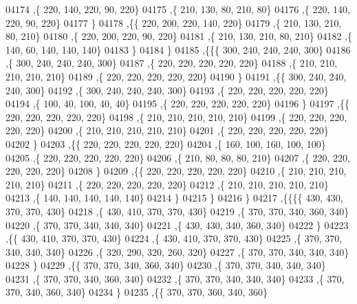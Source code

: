 \begin{DoxyCode}
04174     ,\{   220,   140,   220,    90,   220\}
04175     ,\{   210,   130,    80,   210,    80\}
04176     ,\{   220,   140,   220,    90,   220\}
04177     \}
04178    ,\{\{   220,   200,   220,   140,   220\}
04179     ,\{   210,   130,   210,    80,   210\}
04180     ,\{   220,   200,   220,    90,   220\}
04181     ,\{   210,   130,   210,    80,   210\}
04182     ,\{   140,    60,   140,   140,   140\}
04183     \}
04184    \}
04185   ,\{\{\{   300,   240,   240,   240,   300\}
04186     ,\{   300,   240,   240,   240,   300\}
04187     ,\{   220,   220,   220,   220,   220\}
04188     ,\{   210,   210,   210,   210,   210\}
04189     ,\{   220,   220,   220,   220,   220\}
04190     \}
04191    ,\{\{   300,   240,   240,   240,   300\}
04192     ,\{   300,   240,   240,   240,   300\}
04193     ,\{   220,   220,   220,   220,   220\}
04194     ,\{   100,    40,   100,    40,    40\}
04195     ,\{   220,   220,   220,   220,   220\}
04196     \}
04197    ,\{\{   220,   220,   220,   220,   220\}
04198     ,\{   210,   210,   210,   210,   210\}
04199     ,\{   220,   220,   220,   220,   220\}
04200     ,\{   210,   210,   210,   210,   210\}
04201     ,\{   220,   220,   220,   220,   220\}
04202     \}
04203    ,\{\{   220,   220,   220,   220,   220\}
04204     ,\{   160,   100,   160,   100,   100\}
04205     ,\{   220,   220,   220,   220,   220\}
04206     ,\{   210,    80,    80,    80,   210\}
04207     ,\{   220,   220,   220,   220,   220\}
04208     \}
04209    ,\{\{   220,   220,   220,   220,   220\}
04210     ,\{   210,   210,   210,   210,   210\}
04211     ,\{   220,   220,   220,   220,   220\}
04212     ,\{   210,   210,   210,   210,   210\}
04213     ,\{   140,   140,   140,   140,   140\}
04214     \}
04215    \}
04216   \}
04217  ,\{\{\{\{   430,   430,   370,   370,   430\}
04218     ,\{   430,   410,   370,   370,   430\}
04219     ,\{   370,   370,   340,   360,   340\}
04220     ,\{   370,   370,   340,   340,   340\}
04221     ,\{   430,   430,   340,   360,   340\}
04222     \}
04223    ,\{\{   430,   410,   370,   370,   430\}
04224     ,\{   430,   410,   370,   370,   430\}
04225     ,\{   370,   370,   340,   340,   340\}
04226     ,\{   320,   290,   320,   260,   320\}
04227     ,\{   370,   370,   340,   340,   340\}
04228     \}
04229    ,\{\{   370,   370,   340,   360,   340\}
04230     ,\{   370,   370,   340,   340,   340\}
04231     ,\{   370,   370,   340,   360,   340\}
04232     ,\{   370,   370,   340,   340,   340\}
04233     ,\{   370,   370,   340,   360,   340\}
04234     \}
04235    ,\{\{   370,   370,   360,   340,   360\}

\end{DoxyCode}
